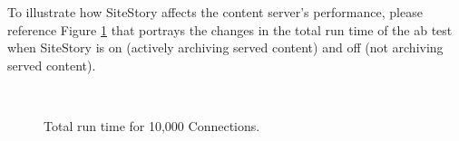 \documentclass[runningheads,a4paper]{llncs}
\begin{document}
To illustrate how SiteStory affects the content server's performance, please reference Figure \ref{tares} 
that portrays the changes in the total run time of the ab test when SiteStory is on (actively archiving served content) and off (not archiving served content).

\begin{figure}[ht]
  \begin{center}
     \\
  \end{center}
  \caption{Total run time for 10,000 Connections.}
  \label{tares}
\end{figure}


\end{document}
